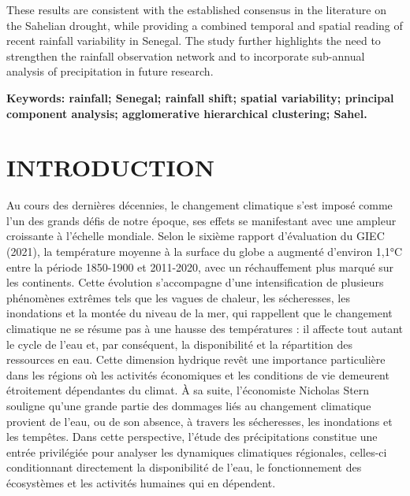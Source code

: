 \documentclass[12pt,a4paper]{report}
\begin{document}
These results are consistent with the established consensus in the literature on the Sahelian drought, while providing a combined temporal and spatial reading of recent rainfall variability in Senegal. The study further highlights the need to strengthen the rainfall observation network and to incorporate sub-annual analysis of precipitation in future research.

\medskip
\noindent\textbf{Keywords: rainfall; Senegal; rainfall shift; spatial variability; principal component analysis; agglomerative hierarchical clustering; Sahel.}

\setcounter{frontmatterpage}{\value{page}}

\clearpage
{}
\chapter*{INTRODUCTION}
Au cours des dernières décennies, le changement climatique s’est imposé comme l’un des grands défis de notre époque, ses effets se manifestant avec une ampleur croissante à l’échelle mondiale. Selon le sixième rapport d'évaluation du GIEC (2021), la température moyenne à la surface du globe a augmenté d'environ 1,1°C entre la période 1850-1900 et 2011-2020, avec un réchauffement plus marqué sur les continents. Cette évolution s'accompagne d'une intensification de plusieurs phénomènes extrêmes tels que les vagues de chaleur, les sécheresses, les inondations et la montée du niveau de la mer, qui rappellent que le changement climatique ne se résume pas à une hausse des températures : il affecte tout autant le cycle de l'eau et, par conséquent, la disponibilité et la répartition des ressources en eau. Cette dimension hydrique revêt une importance particulière dans les régions où les activités économiques et les conditions de vie demeurent étroitement dépendantes du climat. À sa suite, l'économiste Nicholas Stern souligne qu'une grande partie des dommages liés au changement climatique provient de l'eau, ou de son absence, à travers les sécheresses, les inondations et les tempêtes. Dans cette perspective, l'étude des précipitations constitue une entrée privilégiée pour analyser les dynamiques climatiques régionales, celles-ci conditionnant directement la disponibilité de l'eau, le fonctionnement des écosystèmes et les activités humaines qui en dépendent.
\end{document}
